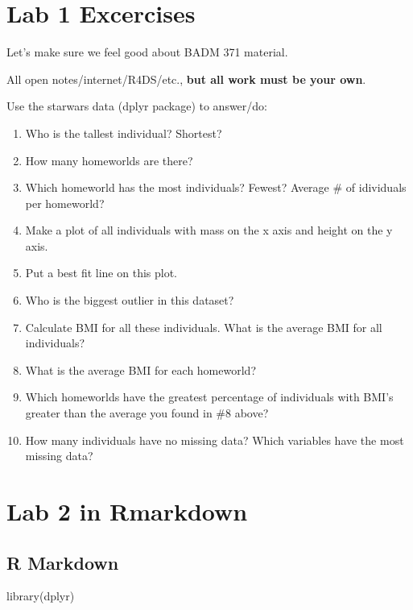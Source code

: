 \documentclass[
]{book}
\newenvironment{Shaded}{\begin{snugshade}}{\end{snugshade}}
\newcommand{\FunctionTok}[1]{\textcolor[rgb]{0.00,0.00,0.00}{#1}}
\newcommand{\NormalTok}[1]{#1}
\providecommand{\tightlist}{%
  \setlength{\itemsep}{0pt}\setlength{\parskip}{0pt}}
\begin{document}
\hypertarget{lab-1-excercises}{%
\chapter{Lab 1 Excercises}\label{lab-1-excercises}}

Let's make sure we feel good about BADM 371 material.

All open notes/internet/R4DS/etc., \textbf{but all work must be your own}.

Use the starwars data (dplyr package) to answer/do:

\begin{enumerate}
\def\labelenumi{\arabic{enumi}.}
\tightlist
\item
  Who is the tallest individual? Shortest?
\item
  How many homeworlds are there?
\item
  Which homeworld has the most individuals? Fewest? Average \# of idividuals per homeworld?
\item
  Make a plot of all individuals with mass on the x axis and height on the y axis.
\item
  Put a best fit line on this plot.
\item
  Who is the biggest outlier in this dataset?
\item
  Calculate BMI for all these individuals. What is the average BMI for all individuals?
\item
  What is the average BMI for each homeworld?
\item
  Which homeworlds have the greatest percentage of individuals with BMI's greater than the average you found in \#8 above?
\item
  How many individuals have no missing data? Which variables have the most missing data?
\end{enumerate}

\hypertarget{lab-2-in-rmarkdown}{%
\chapter{Lab 2 in Rmarkdown}\label{lab-2-in-rmarkdown}}

\hypertarget{r-markdown}{%
\section{R Markdown}\label{r-markdown}}

\begin{Shaded}
\begin{Highlighting}[]
\FunctionTok{library}\NormalTok{(dplyr)}
\end{Highlighting}
\end{Shaded}
\end{document}
